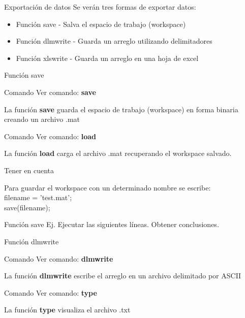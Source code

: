 \documentclass{bredelebeamer}
\begin{document}
\begin{frame}{Exportación de datos}
Se verán tres formas de exportar datos:\\
\begin{itemize}
\item Función save - Salva el espacio de trabajo (workspace)
\item Función dlmwrite - Guarda un arreglo utilizando delimitadores
\item Función xlswrite - Guarda un arreglo en una hoja de excel
\end{itemize}
\end{frame}

\begin{frame}{Función save}
\begin{exampleblock}{Comando}
Ver comando: \textbf{save}
\end{exampleblock}
La función \textbf{save} guarda el espacio de trabajo (workspace) en forma binaria creando un archivo .mat
\begin{exampleblock}{Comando}
Ver comando: \textbf{load}
\end{exampleblock}
La función \textbf{load} carga el archivo .mat recuperando el workspace salvado.
\begin{block}{Tener en cuenta}
\begin{center}
Para guardar el workspace con un determinado nombre se escribe:\\
filename = 'test.mat';\\
save(filename);
\end{center}
\end{block}
\end{frame}

\begin{frame}{Función save}
Ej. Ejecutar las siguientes líneas. Obtener conclusiones.
\end{frame}

\begin{frame}{Función dlmwrite}
\begin{exampleblock}{Comando}
Ver comando: \textbf{dlmwrite}
\end{exampleblock}
La función \textbf{dlmwrite} escribe el arreglo en un archivo delimitado por ASCII
\begin{exampleblock}{Comando}
Ver comando: \textbf{type}
\end{exampleblock}
La función \textbf{type} visualiza el archivo .txt
\end{frame}
\end{document}
